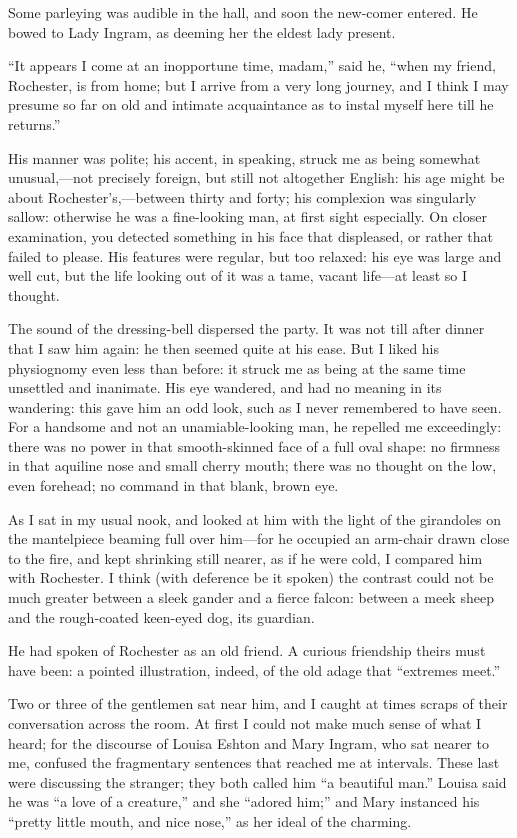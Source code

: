 Some parleying was audible in the hall, and soon the new-comer entered. 
He bowed to Lady Ingram, as deeming her the eldest lady present.

\enquote{It appears I come at an inopportune time, madam,} said he,
\enquote{when my friend, \Mr{} Rochester, is from home; but I arrive from
a very long journey, and I think I may presume so far on old and
intimate acquaintance as to instal myself here till he returns.}

His manner was polite; his accent, in speaking, struck me as being
somewhat unusual,---not precisely foreign, but still not altogether
English: his age might be about \Mr{} Rochester's,---between thirty and
forty; his complexion was singularly sallow: otherwise he was a
fine-looking man, at first sight especially. On closer examination, you
detected something in his face that displeased, or rather that failed to
please. His features were regular, but too relaxed: his eye was large
and well cut, but the life looking out of it was a tame, vacant
life---at least so I thought.

The sound of the dressing-bell dispersed the party. It was not till
after dinner that I saw him again: he then seemed quite at his ease. 
But I liked his physiognomy even less than before: it struck me as being
at the same time unsettled and inanimate. His eye wandered, and had no
meaning in its wandering: this gave him an odd look, such as I never
remembered to have seen. For a handsome and not an unamiable-looking
man, he repelled me exceedingly: there was no power in that
smooth-skinned face of a full oval shape: no firmness in that aquiline
nose and small cherry mouth; there was no thought on the low, even
forehead; no command in that blank, brown eye.

As I sat in my usual nook, and looked at him with the light of the
girandoles on the mantelpiece beaming full over him---for he occupied an
arm-chair drawn close to the fire, and kept shrinking still nearer, as
if he were cold, I compared him with \Mr{} Rochester. I think (with
deference be it spoken) the contrast could not be much greater between a
sleek gander and a fierce falcon: between a meek sheep and the
rough-coated keen-eyed dog, its guardian.

He had spoken of \Mr{} Rochester as an old friend. A curious friendship
theirs must have been: a pointed illustration, indeed, of the old adage
that \enquote{extremes meet.}

Two or three of the gentlemen sat near him, and I caught at times scraps
of their conversation across the room. At first I could not make much
sense of what I heard; for the discourse of Louisa Eshton and Mary
Ingram, who sat nearer to me, confused the fragmentary sentences that
reached me at intervals. These last were discussing the stranger; they
both called him \enquote{a beautiful man.} Louisa said he was
\enquote{a love of a creature,} and she \enquote{adored him;} and Mary
instanced his \enquote{pretty little mouth, and nice nose,} as her ideal
of the charming.

